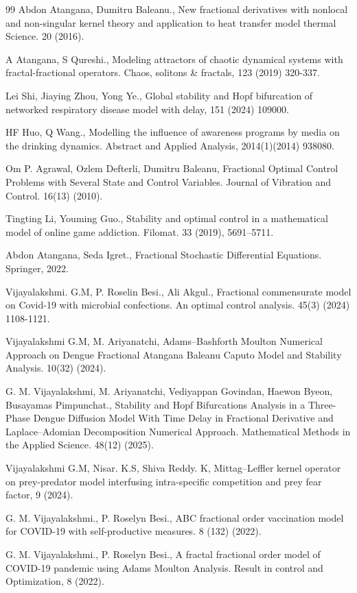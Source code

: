 \documentclass[10pt]{NSP1}
\begin{document}
\begin{thebibliography}{99}
		Abdon Atangana, Dumitru Baleanu., New fractional derivatives with nonlocal and non-singular kernel theory and application to heat transfer model thermal Science. 20 (2016).
		
		A Atangana, S Qureshi., Modeling attractors of chaotic dynamical systems with fractal-fractional operators. Chaos, solitons \& fractals, 123 (2019) 320-337.
		
		Lei Shi, Jiaying Zhou, Yong Ye., Global stability and Hopf bifurcation of networked respiratory disease model with delay, 151 (2024) 109000.
		
		HF Huo, Q Wang., Modelling the influence of awareness programs by media on the drinking dynamics. Abstract and Applied Analysis, 2014(1)(2014) 938080.
		
		Om P. Agrawal, Ozlem Defterli, Dumitru Baleanu, Fractional Optimal Control Problems with Several State and Control Variables. Journal of Vibration and Control. 16(13) (2010).
		
		Tingting Li, Youming Guo., Stability and optimal control in a mathematical model of online game addiction. Filomat. 33 (2019), 5691–5711.
		
		Abdon Atangana, Seda Igret., Fractional Stochastic Differential Equations. Springer, 2022.
		
		Vijayalakshmi. G.M, P. Roselin Besi., Ali Akgul., Fractional commensurate model on Covid-19 with microbial confections. An optimal control analysis. 45(3) (2024) 1108-1121.
		
		Vijayalakshmi G.M, M. Ariyanatchi, Adams–Bashforth Moulton Numerical Approach on Dengue Fractional Atangana Baleanu Caputo Model and Stability Analysis. 10(32) (2024).
		
		G. M. Vijayalakshmi, M. Ariyanatchi, Vediyappan Govindan, Haewon Byeon, Busayamas Pimpunchat., Stability and Hopf Bifurcations Analysis in a Three-Phase Dengue Diffusion Model With Time Delay in Fractional Derivative and Laplace–Adomian Decomposition Numerical Approach. Mathematical Methods in the Applied Science. 48(12) (2025).
		
		Vijayalakshmi G.M, Nisar. K.S, Shiva Reddy. K, Mittag–Leffler kernel operator on prey-predator model interfusing intra-specific competition and prey fear factor, 9 (2024).
		
		G. M. Vijayalakshmi., P. Roselyn Besi., ABC fractional order vaccination model for COVID-19 with self-productive measures. 8 (132) (2022).
		
		G. M. Vijayalakshmi., P. Roselyn Besi., A fractal fractional order model of COVID-19 pandemic using Adams Moulton Analysis. Result in control and Optimization, 8 (2022).
		
	\end{thebibliography}
	
\end{document}
